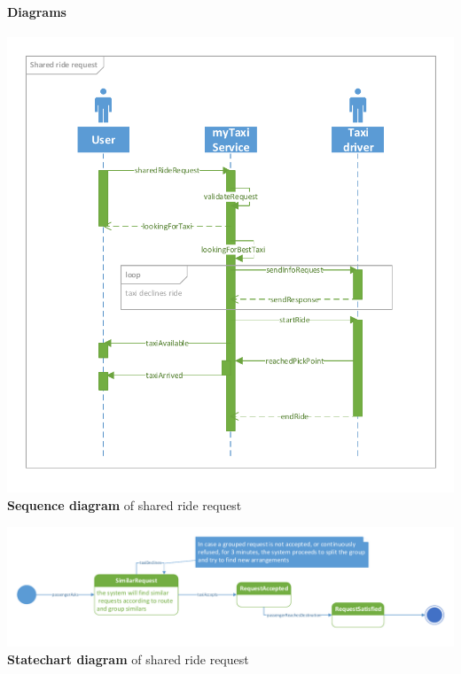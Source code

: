 	\paragraph{Diagrams}
	\begin{center}
	\includegraphics[width=\textwidth]{diagrams/shared_request}
	\textbf{Sequence diagram} of shared ride request
\end{center}
\begin{center}
	\includegraphics[width=\textwidth]{diagrams/shared_state}
	\textbf{Statechart diagram} of shared ride request
\end{center}
	
